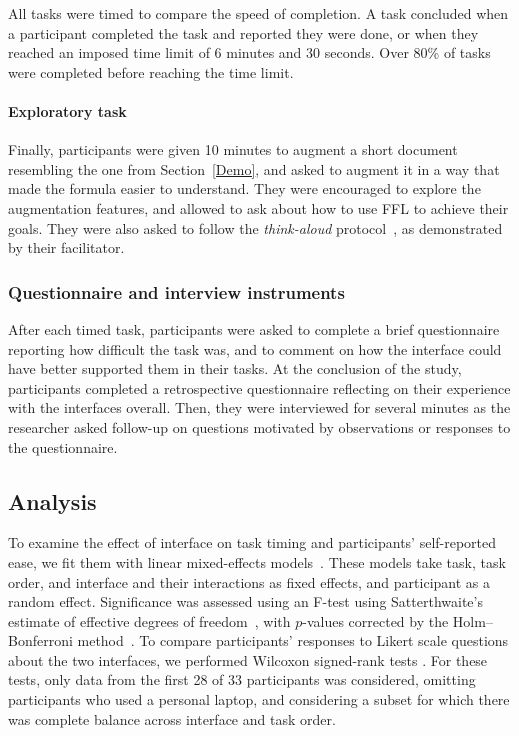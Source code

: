 
All tasks were timed to compare the speed of completion. A task concluded when a participant completed the task and reported they were done, or when they reached an imposed time limit of 6 minutes and 30 seconds.
 Over 80\% of tasks were completed before reaching the time limit. 

\paragraph{Exploratory task} Finally, participants were given 10 minutes to augment a short document resembling the one from Section~\ref{Demo}, and asked to augment it in a way that made the formula easier to understand. They were encouraged to explore the augmentation features, and allowed to ask about how to use FFL to achieve their goals. They were also asked to follow the \textit{think-aloud} protocol~\cite{think-aloud}, as demonstrated by their facilitator. 

\subsubsection{Questionnaire and interview instruments}
After each timed task, participants were asked to complete a brief questionnaire reporting how difficult the task was, and to comment on how the interface could have better supported them in their tasks. At the conclusion of the study, participants completed a retrospective questionnaire reflecting on their experience with the interfaces overall. Then, they were interviewed for several minutes as the researcher asked follow-up on questions motivated by observations or responses to the questionnaire.

\subsection{Analysis}\label{Analysis}
To examine the effect of interface on task timing and participants' self-reported ease, we fit them with linear mixed-effects models~\cite{LmmR}. These models take task, task order, and interface and their interactions as fixed effects, and participant as a random effect. Significance was assessed using an F-test using Satterthwaite's estimate of effective degrees of freedom~\cite{Satterthwaite}, with $p$-values corrected by the Holm–Bonferroni method~\cite{Holm}. To compare participants' responses to Likert scale questions about the two interfaces, we performed Wilcoxon signed-rank tests \cite{Wilcoxon}. For these tests, only data from the first 28 of 33 participants was considered, omitting participants who used a personal laptop, and considering a subset for which there was complete balance across interface and task order.

